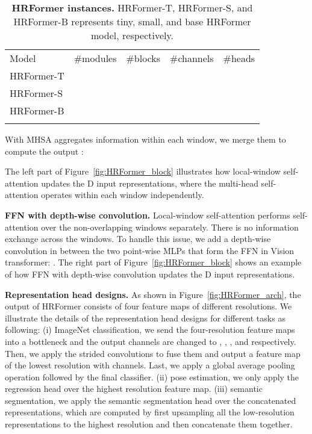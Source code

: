 \documentclass{article}
\begin{document}
\renewcommand{\arraystretch}{1.1}
\begin{table}[h]
  \footnotesize
  \centering
  \caption{\footnotesize\textbf{HRFormer instances.}
    HRFormer-T, HRFormer-S, and HRFormer-B represents tiny, small, and base HRFormer model, respectively.
  }
  \label{tab:HRFormer_arch_variants}
  \setlength{\tabcolsep}{8pt}
  \begin{tabular}{l|c|c|c|c}
    \shline
    Model      & \thead{\#modules                                                                                          \\ } & \thead{\#blocks\\} & \thead{\#channels \\ } & \thead{\#heads\\} \\
    \shline
    HRFormer-T &  &  &    &   \\
    HRFormer-S &  &  &   &   \\
    HRFormer-B &  &  &  &  \\
    \shline
  \end{tabular}
\end{table}


With \rm{MHSA} aggregates information within each window, we merge them to compute
the output :
\begin{ceqn}
  
\end{ceqn}
The left part of Figure~\ref{fig:HRFormer_block} illustrates how local-window self-attention updates the D input representations,
where the multi-head self-attention operates within each window independently.


\vspace{.1cm}
\noindent\textbf{FFN with depth-wise convolution.}
Local-window self-attention performs self-attention
over the non-overlapping windows separately.
There is no information exchange across the windows.
To handle this issue,
we add a  depth-wise convolution in
between the two point-wise MLPs
that form the FFN in Vision transformer:
.
The right part of Figure~\ref{fig:HRFormer_block} shows an example
of how FFN with  depth-wise convolution updates the D input representations.


\vspace{.1cm}
\noindent\textbf{Representation head designs.}
As shown in Figure~\ref{fig:HRFormer_arch},
the output of HRFormer consists of four feature maps of different resolutions.
We illustrate the details of the representation head designs for
different tasks as following:
(i) ImageNet classification,
we send the four-resolution feature maps into a bottleneck and the output channels
are changed to , , , and  respectively.
Then, we apply the strided convolutions to fuse them and output a
feature map of the lowest resolution with  channels.
Last, we apply a global average pooling operation followed by the final classifier.
(ii) pose estimation,
we only apply the regression head over the highest resolution feature map.
(iii) semantic segmentation,
we apply the semantic segmentation head over the concatenated representations,
which are computed by first upsampling all the low-resolution representations to the highest resolution and then concatenate them together.
\end{document}
